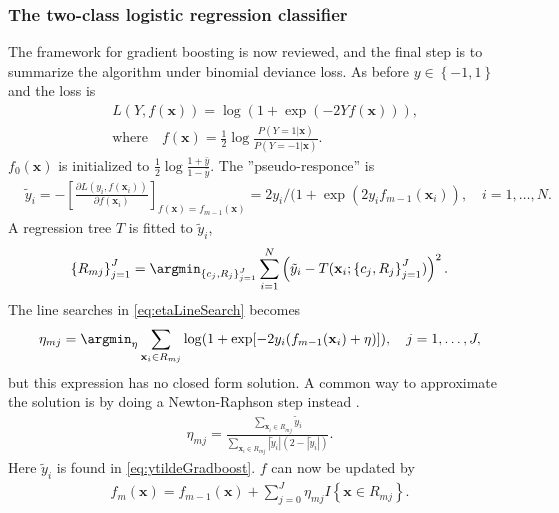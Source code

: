 \subsubsection{The two-class logistic regression classifier}
\label{sub:The two-class logistic regression classifier}
The framework for gradient boosting is now reviewed, and the final step is to summarize the algorithm under binomial deviance loss. As before $y \in \left\{ -1, 1 \right\}$ and the loss is 
\begin{align}
  &L(Y, f(\mathbf{x})) = \log (1 + \exp (-2 Y f(\mathbf{x}))),\\
  &\text{where} \quad f(\mathbf{x}) = \frac{1}{2} \log \frac{ P(Y = 1 | \mathbf{x})}{ P(Y = -1 | \mathbf{x})}  .
\end{align}
$f_0(\mathbf{x})$ is initialized to $\frac{1}{2} \log \frac{1+\bar{y}}{1-\bar{y}}$.  The ''pseudo-responce'' is
\begin{align}
  \label{eq:ytildeGradboost} 
  &\tilde{y}_i = 
  -\left[ \frac{\partial L(y_i, f(\mathbf{x}_i)) }{\partial f(\mathbf{x}_i)}  \right]_{f(\mathbf{x}) = f_{m-1}(\mathbf{x})}
  = 2 y_i / (1 + \exp \left( 2 y_i f_{m-1}(\mathbf{x}_i) \right), \quad i = 1, \ldots, N.
\end{align}
A regression tree $T$ is fitted to $\tilde y_i$,
\begin{align}
  \left\{ R_{m j} \right\}_{j = 1}^J  = 
  \argmin_{\left\{ c_j, R_{j} \right\}_{j = 1}^J} \sum^{N}_{i=1} \left( \tilde y_i - T(\mathbf{x}_i; \left\{ c_j, R_j \right\}_{j = 1}^J) \right)^2.
\end{align}
The line searches in \eqref{eq:etaLineSearch} becomes
\begin{align}
  \eta_{m j} = \argmin_\eta  \sum_{\mathbf{x}_i \in R_{m j}} \log (1 + \exp [-2 y_i (f_{m-1}(\mathbf{x}_i) + \eta) ]), \quad j = 1, \ldots, J,
\end{align}
but this expression has no closed form solution. A common way to approximate the solution is by doing a Newton-Raphson step instead \cite{friedman}.
\begin{align}
  \eta_{m j} =  \frac{\sum_{\mathbf{x}_i \in R_{m j}} \tilde y_i}{\sum_{\mathbf{x}_i \in R_{m j}} |\tilde y_i|(2-|\tilde y_i|)}.
\end{align}
Here  $\tilde y_i$ is found in \eqref{eq:ytildeGradboost}. $f$ can now be updated by
\begin{align}
  \label{eq:gradBoostUpdateF} 
  f_m(\mathbf{x}) = f_{m-1}(\mathbf{x}) +  \sum^{J}_{j=0} \eta_{m j} I\left\{ \mathbf{x} \in R_{m j} \right\}.
\end{align}
